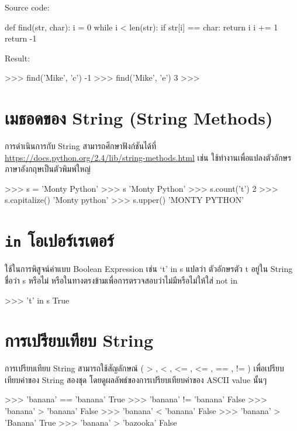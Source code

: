 Source code:
\begin{pycode}
def find(str, char):
    i = 0
    while i < len(str):
       if str[i] == char: return i
       i += 1
    return -1
\end{pycode}

Result:
\begin{pycode}
>>> find('Mike', 'c')
-1
>>> find('Mike', 'e')
3
>>>
\end{pycode}



\section{เมธอดของ String (String Methods)}

การดำเนินการกับ String สามารถศึกษาฟังก์ชันได้ที่ \url{https://docs.python.org/2.4/lib/string-methods.html} เช่น   ใช้ทำงานเพื่อแปลงตัวอักษรภาษาอังกฤษเป็นตัวพิมพ์ใหญ่

\begin{pycode}
>>> s = 'Monty Python'
>>> s
'Monty Python'
>>> s.count('t')
2
>>> s.capitalize()
'Monty python'
>>> s.upper()
'MONTY PYTHON'

\end{pycode}


\section{\texttt{in} โอเปอร์เรเตอร์}

ใช้ในการพิสูจน์ค่าแบบ Boolean Expression เช่น ‘t’ in s แปลว่า ตัวอักษรตัว t อยู่ใน String ชื่อว่า s หรือไม่ หรือในทางตรงข้ามเพื่อการตรวจสอบว่าไม่มีหรือไม่ให้ใส่ not in 

\begin{pycode}
>>> 't' in s
True
\end{pycode}

\section{การเปรียบเทียบ String}

การเปรียบเทียบ String สามารถใช้สัญลักษณ์  ( > , < , <= , <= , == , !=  ) เพื่อเปรียบเทียบค่าของ String สองชุด โดยดูผลลัพธ์ของการเปรียบเทียบค่าของ ASCII value นั้นๆ

\begin{pycode}
>>> 'banana' == 'banana'
True
>>> 'banana' !=  'banana'
False
>>>  'banana' >  'banana'
False
>>>  'banana' <  'banana'
False
>>>  'banana' >  'Banana'
True
>>>  'banana' >  'bazooka'
False
\end{pycode}


